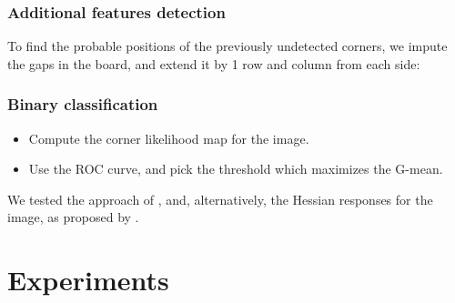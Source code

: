 \documentclass{beamer}
\begin{document}
\begin{frame}
	\frametitle{Additional features detection}
	To find the probable positions of the previously undetected corners, we
	impute the gaps in the board, and extend it by 1 row and column from each
	side:
	\begin{figure}
		\begin{subfigure}{0.45\linewidth}
		\end{subfigure}
		\begin{subfigure}{0.45\linewidth}
		\end{subfigure}
	\end{figure}
\end{frame}

\begin{frame}
	\frametitle{Binary classification}
	\begin{itemize}
		\item Compute the corner likelihood map for the image.
		\item Use the ROC curve, and pick the threshold which maximizes the G-mean.
	\end{itemize}

	We tested the approach of \cite{geigerAutomaticCameraRange2012}, and,
	alternatively, the Hessian responses for the image, as proposed by
	\cite{chenNewSubPixelDetector2005}.
\end{frame}

\section{Experiments}\label{sec:experiments}
\end{document}
